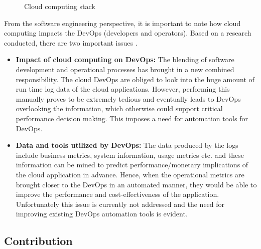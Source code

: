 \documentclass[article,type=msc,colorback,12pt,accentcolor=tud8b,table]{tudthesis}
\begin{document}
 \begin{figure}
 \begin{center}
\end{center}
\caption{Cloud computing stack}
\label{fig:ccstack}
\end{figure}

%	
%	
%	
	
 From the software engineering perspective, it is important to note how cloud computing impacts the DevOps (developers and operators). Based on a research conducted, there are two important issues \cite{cito2015making}. 

\begin{itemize}
	\item \textbf{Impact of cloud computing on DevOps:}
	The blending of software development and operational processes has brought in a new combined responsibility. The cloud DevOps are obliged to look into the huge amount of run time log data of the cloud applications. However, performing this manually proves to be extremely tedious and eventually leads to DevOps overlooking the information, which otherwise could support critical performance decision making. This imposes a need for automation tools for DevOps.
	
	\item \textbf{Data and tools utilized by DevOps:}
	The data produced by the logs include business metrics, system information, usage metrics etc. and these information can be mined to predict performance/monetary implications of the cloud application in advance. Hence, when the operational metrics are brought closer to the DevOps in an automated manner, they would be able to improve the performance and cost-effectiveness of the application. Unfortunately this issue is currently not addressed and the need for improving existing DevOps automation tools is evident.
	
\end{itemize}
 
	\subsection{Contribution}	
	
\end{document}
